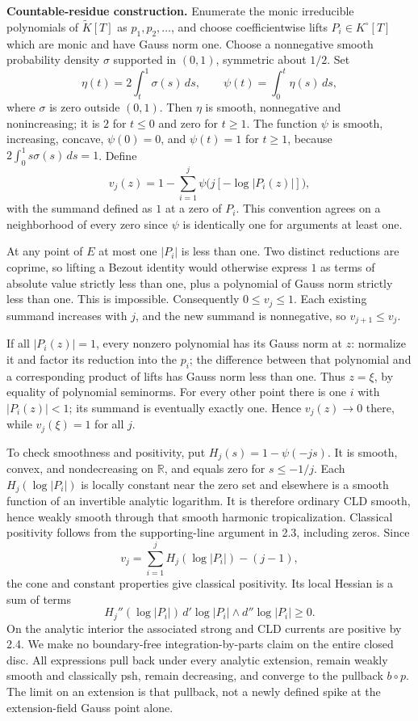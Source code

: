 \documentclass[11pt]{article}
\begin{document}
\textbf{Countable-residue construction.} Enumerate the monic irreducible polynomials of \(\widetilde K[T]\) as \(p_1,p_2,\ldots\), and choose coefficientwise lifts \(P_i\in K^\circ[T]\) which are monic and have Gauss norm one. Choose a nonnegative smooth probability density \(\sigma\) supported in \((0,1)\), symmetric about \(1/2\). Set
\[
\eta(t)=2\int_t^1\sigma(s)\,ds,\qquad
\psi(t)=\int_0^t\eta(s)\,ds,
\]
where \(\sigma\) is zero outside \((0,1)\). Then \(\eta\) is smooth, nonnegative and nonincreasing; it is \(2\) for \(t\le0\) and zero for \(t\ge1\). The function \(\psi\) is smooth, increasing, concave, \(\psi(0)=0\), and \(\psi(t)=1\) for \(t\ge1\), because \(2\int_0^1 s\sigma(s)\,ds=1\). Define
\[
v_j(z)=1-\sum_{i=1}^j\psi\bigl(j[-\log|P_i(z)|]\bigr),
\]
with the summand defined as \(1\) at a zero of \(P_i\). This convention agrees on a neighborhood of every zero since \(\psi\) is identically one for arguments at least one.

At any point of \(E\) at most one \(|P_i|\) is less than one. Two distinct reductions are coprime, so lifting a Bezout identity would otherwise express \(1\) as terms of absolute value strictly less than one, plus a polynomial of Gauss norm strictly less than one. This is impossible. Consequently \(0\le v_j\le1\). Each existing summand increases with \(j\), and the new summand is nonnegative, so \(v_{j+1}\le v_j\).

If all \(|P_i(z)|=1\), every nonzero polynomial has its Gauss norm at \(z\): normalize it and factor its reduction into the \(p_i\); the difference between that polynomial and a corresponding product of lifts has Gauss norm less than one. Thus \(z=\xi\), by equality of polynomial seminorms. For every other point there is one \(i\) with \(|P_i(z)|<1\); its summand is eventually exactly one. Hence \(v_j(z)\to0\) there, while \(v_j(\xi)=1\) for all \(j\).

To check smoothness and positivity, put \(H_j(s)=1-\psi(-js)\). It is smooth, convex, and nondecreasing on \(\mathbb R\), and equals zero for \(s\le-1/j\). Each \(H_j(\log|P_i|)\) is locally constant near the zero set and elsewhere is a smooth function of an invertible analytic logarithm. It is therefore ordinary CLD smooth, hence weakly smooth through that smooth harmonic tropicalization. Classical positivity follows from the supporting-line argument in 2.3, including zeros. Since
\[
v_j=\sum_{i=1}^jH_j(\log|P_i|)-(j-1),
\]
the cone and constant properties give classical positivity. Its local Hessian is a sum of terms
\[
H_j''(\log|P_i|)\,d'\log|P_i|\wedge d''\log|P_i|\ge0.
\]
On the analytic interior the associated strong and CLD currents are positive by 2.4. We make no boundary-free integration-by-parts claim on the entire closed disc. All expressions pull back under every analytic extension, remain weakly smooth and classically psh, remain decreasing, and converge to the pullback \(b\circ p\). The limit on an extension is that pullback, not a newly defined spike at the extension-field Gauss point alone.
\end{document}
